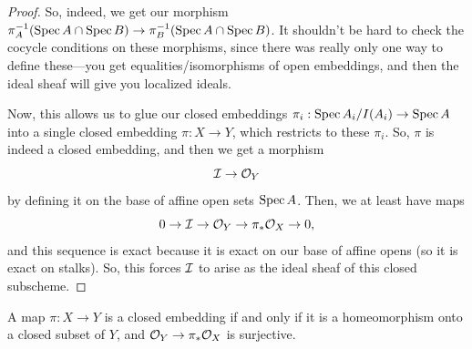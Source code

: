 \documentclass[12pt]{article}
\begin{document}
\begin{proof}
    So, indeed, we get our morphism $\pi_A^{-1}(\operatorname{Spec} A \cap \operatorname{Spec} B) \to \pi_B^{-1}(\operatorname{Spec} A \cap \operatorname{Spec} B)$. It shouldn't be hard to check the cocycle conditions on these morphisms, since there was really only one way to define these---you get equalities/isomorphisms of open embeddings, and then the ideal sheaf will give you localized ideals.

    Now, this allows us to glue our closed embeddings $\pi_i: \operatorname{Spec} A_i/I(A_i) \to \operatorname{Spec} A$ into a single closed embedding $\pi: X \to Y$, which restricts to these $\pi_i$. So, $\pi$ is indeed a closed embedding, and then we get a morphism
    \[\mathcal{I} \to \mathcal{O}_Y\]
    by defining it on the base of affine open sets $\operatorname{Spec} A$. Then, we at least have maps
    \[0 \to \mathcal{I} \to \mathcal{O}_Y \to \pi_* \mathcal{O}_X \to 0,\]
    and this sequence is exact because it is exact on our base of affine opens (so it is exact on stalks). So, this forces $\mathcal{I}$ to arise as the ideal sheaf of this closed subscheme.
\end{proof}

\begin{prop}
    A map $\pi: X\to Y$ is a closed embedding if and only if it is a homeomorphism onto a closed subset of $Y$, and $\mathcal{O}_Y \to \pi_* \mathcal{O}_X$ is surjective.
\end{prop}
\end{document}
